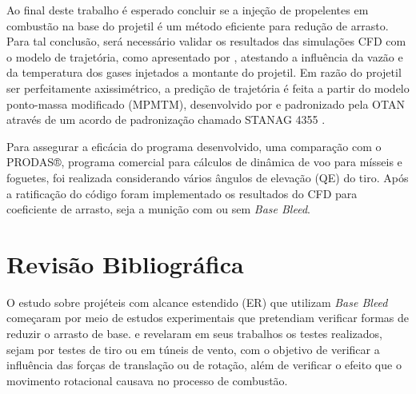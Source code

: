 Ao final deste trabalho é esperado concluir se a injeção de propelentes em combustão na base do projetil é um método eficiente para redução de arrasto. Para tal conclusão, será necessário validar os resultados das simulações CFD com o modelo de trajetória, como apresentado por \citeauthor{Rosendo2020}, atestando a influência da vazão e da temperatura dos gases injetados a montante do projetil. Em razão do projetil ser perfeitamente axissimétrico, a predição de trajetória é feita a partir do modelo ponto-massa modificado (MPMTM), desenvolvido por \citeauthor{Lieske1966} e padronizado pela OTAN através de um acordo de padronização chamado STANAG 4355 \cite{stanag4355}. 

Para assegurar a eficácia do programa desenvolvido, uma comparação com o PRODAS®, programa comercial para cálculos de dinâmica de voo para mísseis e foguetes, foi realizada considerando vários ângulos de elevação (QE) do tiro. Após a ratificação do código foram implementado os resultados do CFD para coeficiente de arrasto, seja a munição com ou sem \textit{Base Bleed}. 

\section{Revisão Bibliográfica}

O estudo sobre projéteis com alcance estendido (ER) que utilizam \textit{Base Bleed} começaram por meio de estudos experimentais que pretendiam verificar formas de reduzir o arrasto de base. \citeauthor{Sedney1966} e \citeauthor{Andersson1976} revelaram em seus trabalhos os testes realizados, sejam por testes de tiro ou em túneis de vento, com o objetivo de verificar a influência das forças de translação ou de rotação, além de verificar o efeito que o movimento rotacional causava no processo de combustão.

